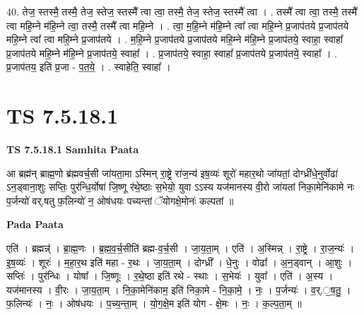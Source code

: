 \documentclass[17pt]{extarticle}
\begin{document}
40. तेज॒ स्तस्मै॒ तस्मै॒ तेज॒ स्तेज॒ स्तस्मै᳚ त्वा त्वा॒ तस्मै॒ तेज॒ स्तेज॒ स्तस्मै᳚ त्वा । . तस्मै᳚ त्वा त्वा॒ तस्मै॒ तस्मै᳚ त्वा महि॒म्ने म॑हि॒म्ने त्वा॒ तस्मै॒ तस्मै᳚ त्वा महि॒म्ने । . त्वा॒ म॒हि॒म्ने म॑हि॒म्ने त्वा᳚ त्वा महि॒म्ने प्र॒जाप॑तये प्र॒जाप॑तये महि॒म्ने त्वा᳚ त्वा महि॒म्ने प्र॒जाप॑तये । . म॒हि॒म्ने प्र॒जाप॑तये प्र॒जाप॑तये महि॒म्ने म॑हि॒म्ने प्र॒जाप॑तये॒ स्वाहा॒ स्वाहा᳚ प्र॒जाप॑तये महि॒म्ने म॑हि॒म्ने प्र॒जाप॑तये॒ स्वाहा᳚ । . प्र॒जाप॑तये॒ स्वाहा॒ स्वाहा᳚ प्र॒जाप॑तये प्र॒जाप॑तये॒ स्वाहा᳚ । . प्र॒जाप॑तय॒ इति॑ प्र॒जा - प॒त॒ये॒ । . स्वाहेति॒ स्वाहा᳚ । \newline
\pagebreak
{}

\section{ TS 7.5.18.1 }

\textbf{TS 7.5.18.1 } \newline
\textbf{Samhita Paata} \newline

आ ब्रह्म॑न् ब्राह्म॒णो ब्र॑ह्मवर्च॒सी जा॑यता॒मा ऽस्मिन् रा॒ष्ट्रे रा॑ज॒न्य॑ इष॒व्यः॑ शूरो॑ महार॒थो जा॑यतां॒ दोग्ध्री॑धे॒नुर्वोढा॑ ऽन॒ड्वाना॒शुः सप्तिः॒ पुर॑न्धि॒र्योषा॑ जि॒ष्णू र॑थे॒ष्ठाः स॒भेयो॒ युवा ऽऽस्य यज॑मानस्य वी॒रो जा॑यतां निका॒मेनि॑कामे नः प॒र्जन्यो॑ वर्.षतु फ॒लिन्यो॑ न॒ ओष॑धयः पच्यन्तां ॅयोगक्षे॒मोनः॑ कल्पतां ॥ \newline

\textbf{Pada Paata} \newline

एति॑ । ब्रह्मन्न्॑ । ब्रा॒ह्म॒णः । ब्र॒ह्म॒व॒र्च॒सीति॑ ब्रह्म-व॒र्च॒सी । जा॒य॒ता॒म् । एति॑ । अ॒स्मिन्न् । रा॒ष्ट्रे । रा॒ज॒न्यः॑ । इ॒ष॒व्यः॑ । शूरः॑ । म॒हा॒र॒थ इति॑ महा - र॒थः । जा॒य॒ता॒म् । दोग्ध्री᳚ । धे॒नुः । वोढा᳚ । अ॒न॒ड्वान् । आ॒शुः । सप्तिः॑ । पुर॑न्धिः । योषा᳚ । जि॒ष्णूः । र॒थे॒ष्ठा इति॑ रथे - स्थाः । स॒भेयः॑ । युवा᳚ । एति॑ । अ॒स्य । यज॑मानस्य । वी॒रः । जा॒य॒ता॒म् । नि॒का॒मेनि॑काम॒ इति॑ निका॒मे - नि॒का॒मे॒ । नः॒ । प॒र्जन्यः॑ । व॒र्.॒ष॒तु॒ । फ॒लिन्यः॑ । नः॒ । ओष॑धयः । प॒च्य॒न्ता॒म् । यो॒ग॒क्षे॒म इति॑ योग - क्षे॒मः । नः॒ । क॒ल्प॒ता॒म् ॥  \newline
\end{document}
